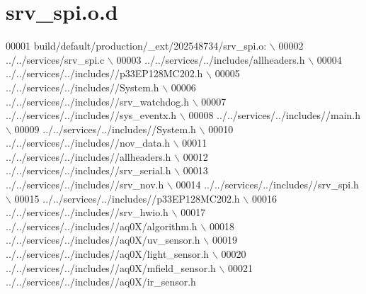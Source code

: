\hypertarget{a00065_source}{\section{srv\+\_\+spi.\+o.\+d}
\label{a00065_source}
}

\begin{DoxyCode}
00001 build/\textcolor{keywordflow}{default}/production/\_ext/202548734/srv\_spi.o:  \(\backslash\)
00002  ../../services/srv\_spi.c  \(\backslash\)
00003 ../../services/../includes/allheaders.h  \(\backslash\)
00004 ../../services/../includes\textcolor{comment}{//p33EP128MC202.h  \(\backslash\)}
00005 \textcolor{comment}{../../services/../includes//System.h  \(\backslash\)}
00006 \textcolor{comment}{../../services/../includes//srv\_watchdog.h  \(\backslash\)}
00007 \textcolor{comment}{../../services/../includes//sys\_eventx.h  \(\backslash\)}
00008 \textcolor{comment}{../../services/../includes//main.h  \(\backslash\)}
00009 \textcolor{comment}{../../services/../includes//System.h  \(\backslash\)}
00010 \textcolor{comment}{../../services/../includes//nov\_data.h  \(\backslash\)}
00011 \textcolor{comment}{../../services/../includes//allheaders.h  \(\backslash\)}
00012 \textcolor{comment}{../../services/../includes//srv\_serial.h  \(\backslash\)}
00013 \textcolor{comment}{../../services/../includes//srv\_nov.h  \(\backslash\)}
00014 \textcolor{comment}{../../services/../includes//srv\_spi.h  \(\backslash\)}
00015 \textcolor{comment}{../../services/../includes//p33EP128MC202.h  \(\backslash\)}
00016 \textcolor{comment}{../../services/../includes//srv\_hwio.h  \(\backslash\)}
00017 \textcolor{comment}{../../services/../includes//aq0X/algorithm.h  \(\backslash\)}
00018 \textcolor{comment}{../../services/../includes//aq0X/uv\_sensor.h  \(\backslash\)}
00019 \textcolor{comment}{../../services/../includes//aq0X/light\_sensor.h  \(\backslash\)}
00020 \textcolor{comment}{../../services/../includes//aq0X/mfield\_sensor.h  \(\backslash\)}
00021 \textcolor{comment}{../../services/../includes//aq0X/ir\_sensor.h }
\end{DoxyCode}

